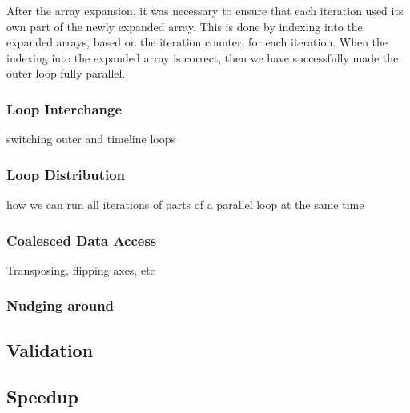 \documentclass[11pt]{article}
\begin{document}
After the array expansion,
it was necessary to ensure that each iteration used its own part of the newly
expanded array. This is done by indexing into the expanded arrays, based on the
iteration counter, for each iteration. When the indexing into the expanded
array is correct, then we have successfully made the outer loop fully parallel.


\subsubsection{Loop Interchange}
switching outer and timeline loops

\subsubsection{Loop Distribution}
how we can run all iterations of parts of a parallel loop at the same time


\subsubsection{Coalesced Data Access}
Transposing, flipping axes, etc

\subsubsection{Nudging around}

\subsection{Validation}
\subsection{Speedup}
\begin{table}[h]
\centering
{}
\caption{Speedup comparison of the original implementation, the OpenMP implementation and the CUDA implementation}
\label{table:cudatime}
\end{table}
\end{document}
